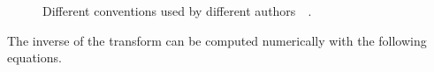 \begin{figure} [H]
\centering     %
{}
\caption{Different conventions used by different authors~\cite{featherstone2014rigid}~\cite{craig2005introduction}.}
\label{fig:diffinconventions}
\end{figure}

The inverse of the transform can be computed numerically with the following equations. 


